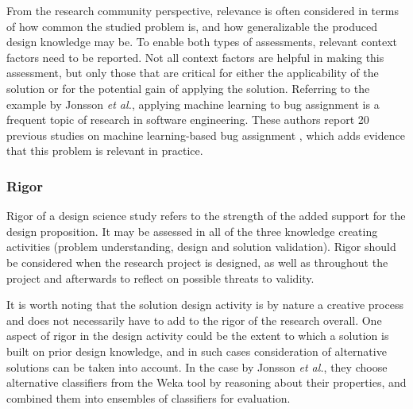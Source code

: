 \documentclass[graybox]{svmult}
\begin{document}
From the research community perspective, relevance is often considered in terms of how common the studied problem is, and how generalizable the produced design knowledge may be. To enable both types of assessments, relevant context factors need to be reported. Not all context factors are helpful in making this assessment, but only those that are critical for either the applicability of the solution or for the potential gain of applying the solution. 
Referring to the example by Jonsson \emph{et al.}, applying machine learning to bug assignment is  a frequent topic of research in software engineering. These authors report 20 previous studies on machine learning-based bug assignment \cite[Fig.2]{JonssonBug15}, which adds evidence that this problem is relevant in practice.

\subsubsection{Rigor %
} 
Rigor of a design science study refers to the strength of the added support for the design proposition. It may be assessed in all of the three knowledge creating activities (problem understanding, design and solution validation). 
Rigor should be considered when the research project is designed, as well as throughout the project and afterwards to reflect on possible threats to validity. 

It is worth noting that the solution design activity is by nature a creative process and does not necessarily have to add to the rigor of the research overall. One aspect of rigor in the design activity could be the extent to which a solution is built on prior design knowledge, and in such cases consideration of alternative solutions can be taken into account. 
In the case by Jonsson \emph{et al.}, they choose alternative classifiers from the Weka tool by reasoning about their properties, and combined them into ensembles of classifiers for evaluation.
\end{document}
